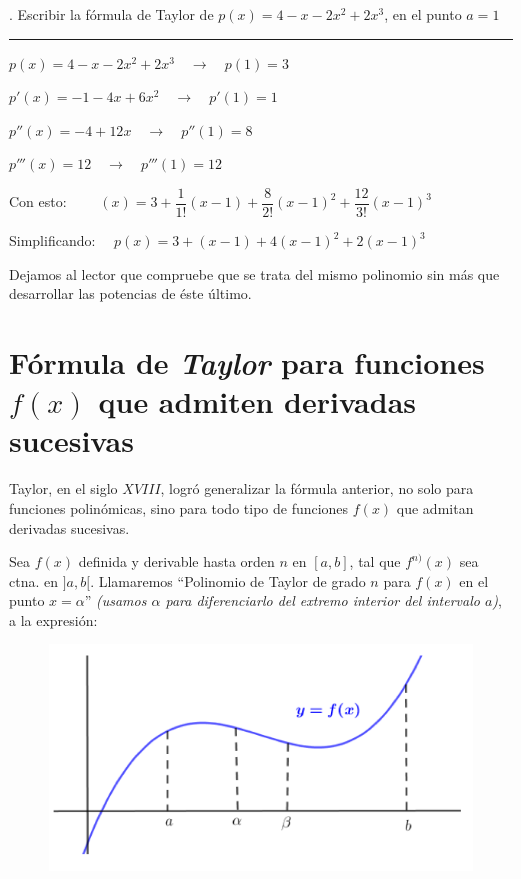 	\vspace{5mm}
	\begin{miejercicio}
	.	Escribir la fórmula de Taylor de $p(x)=	4-x-2x^2+2x^3$, en el punto $a=1$
	
	\rule{200pt}{0.1pt}
	
	$p(x)=	4-x-2x^2+2x^3 \quad \to \quad p(1)=3$
	
	$p'(x)=-1-4x+6x^2 \quad \to \quad  p'(1)=1$
	
	$p''(x)= -4+12x \quad \to \quad  p''(1)=8$
	
	$p'''(x)=12 \quad \to \quad p'''(1)=12$
	
	Con esto:  $\qquad (x)=3+\dfrac {1}{1!}(x-1)+\dfrac {8}{2!}(x-1)^2+\dfrac {12}{3!}(x-1)^3$
	
	Simplificando: $\quad  p(x)= 3+(x-1)+4(x-1)^2+2(x-1)^3$
	
	\textcolor{gris}{Dejamos al lector que compruebe que se trata del mismo polinomio sin más que desarrollar las potencias de éste último.}
	\end{miejercicio}
	
	\section[Fórmula de \emph{Taylor} para funciones $f(x)$ que admiten derivadas sucesivas]{Fórmula de \emph{Taylor} para funciones $f(x)$ que admiten derivadas sucesivas}
	
\vspace{0.5cm}
	
	Taylor, en el siglo $XVIII$, logró generalizar la fórmula anterior, no solo para funciones polinómicas, sino para todo tipo de funciones $f(x)$ que admitan derivadas sucesivas.
	
		\begin{multicols}{2}
		Sea $f(x)$ definida y derivable hasta orden $n$ en $[a,b]$, tal que $f^{n)}(x)$ sea ctna. en $]a,b[$. Llamaremos ``Polinomio de Taylor de grado $n$ para $f(x)$ en el punto $x=\alpha$'' \textit{(usamos $\alpha$ para diferenciarlo del extremo interior del intervalo $a$)}, a la expresión:
		
		\begin{figure}[H]
		\centering
		\includegraphics[width=.4\textwidth]{imagenes/Taylor/T06IM03.png}
		\end{figure}
		
		\end{multicols}

